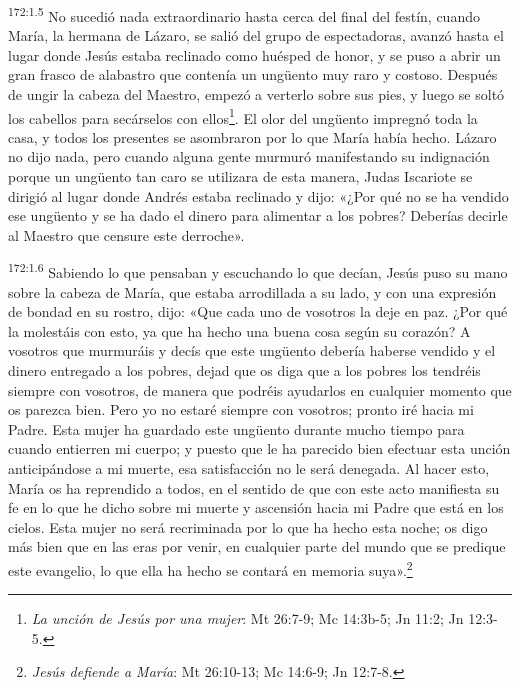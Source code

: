 \par 
\textsuperscript{172:1.5} No sucedió nada extraordinario hasta cerca del final del festín, cuando María, la hermana de Lázaro, se salió del grupo de espectadoras, avanzó hasta el lugar donde Jesús estaba reclinado como huésped de honor, y se puso a abrir un gran frasco de alabastro que contenía un ung\"uento muy raro y costoso. Después de ungir la cabeza del Maestro, empezó a verterlo sobre sus pies, y luego se soltó los cabellos para secárselos con ellos\footnote{\textit{La unción de Jesús por una mujer}: Mt 26:7-9; Mc 14:3b-5; Jn 11:2; Jn 12:3-5.}. El olor del ung\"uento impregnó toda la casa, y todos los presentes se asombraron por lo que María había hecho. Lázaro no dijo nada, pero cuando alguna gente murmuró manifestando su indignación porque un ung\"uento tan caro se utilizara de esta manera, Judas Iscariote se dirigió al lugar donde Andrés estaba reclinado y dijo: «¿Por qué no se ha vendido ese ung\"uento y se ha dado el dinero para alimentar a los pobres? Deberías decirle al Maestro que censure este derroche».

\par 
\textsuperscript{172:1.6} Sabiendo lo que pensaban y escuchando lo que decían, Jesús puso su mano sobre la cabeza de María, que estaba arrodillada a su lado, y con una expresión de bondad en su rostro, dijo: «Que cada uno de vosotros la deje en paz. ¿Por qué la molestáis con esto, ya que ha hecho una buena cosa según su corazón? A vosotros que murmuráis y decís que este ung\"uento debería haberse vendido y el dinero entregado a los pobres, dejad que os diga que a los pobres los tendréis siempre con vosotros, de manera que podréis ayudarlos en cualquier momento que os parezca bien. Pero yo no estaré siempre con vosotros; pronto iré hacia mi Padre. Esta mujer ha guardado este ung\"uento durante mucho tiempo para cuando entierren mi cuerpo; y puesto que le ha parecido bien efectuar esta unción anticipándose a mi muerte, esa satisfacción no le será denegada. Al hacer esto, María os ha reprendido a todos, en el sentido de que con este acto manifiesta su fe en lo que he dicho sobre mi muerte y ascensión hacia mi Padre que está en los cielos. Esta mujer no será recriminada por lo que ha hecho esta noche; os digo más bien que en las eras por venir, en cualquier parte del mundo que se predique este evangelio, lo que ella ha hecho se contará en memoria suya».\footnote{\textit{Jesús defiende a María}: Mt 26:10-13; Mc 14:6-9; Jn 12:7-8.}

